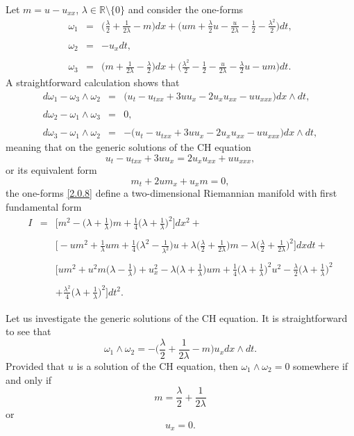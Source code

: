 \documentclass{cimart}
\newcommand{\ba}{\begin{array}}
\newcommand{\bb}{\begin{equation}}
\newcommand{\ea}{\end{array}}
\newcommand{\ee}{\end{equation}}
\begin{document}
\begin{example}\label{ex2.2}
     Let $m=u-u_{xx}$, $\lambda\in\mathbb{R}\setminus\{0\}$ and consider the one-forms
\bb\label{2.0.8}
\ba{lcl}
\omega_1&=&{\Big(\frac{\lambda}{2}+\frac{1}{2\lambda}-m\Big)dx+\Big(um+\frac{\lambda}{2}u-\frac{u}{2\lambda}-\frac{1}{2}-\frac{\lambda^2}{2}\Big)dt},\\
\\
\omega_2&=&-u_xdt,\\
\\
\omega_3&=&{\Big(m+\frac{1}{2\lambda}-\frac{\lambda}{2}\Big)dx+\Big(\frac{\lambda^2}{2}-\frac{1}{2}-\frac{u}{2\lambda}-\frac{\lambda}{2}u-um\Big)dt}.
\ea
\ee
A straightforward calculation shows that
\bb\label{2.0.9}
\ba{lcl}
d\omega_1-\omega_3\wedge\omega_2&=&\Big(u_t-u_{txx}+3uu_x-2u_xu_{xx}-uu_{xxx}\Big)dx\wedge dt,\\
\\
d\omega_2-\omega_1\wedge\omega_3&=&0,\\
\\
d\omega_3-\omega_1\wedge\omega_2&=&-\Big(u_t-u_{txx}+3uu_x-2u_xu_{xx}-uu_{xxx}\Big)dx\wedge dt,
\ea
\ee
meaning that on the generic solutions of the CH equation 
   \bb\label{1.0.5}
    u_t-u_{txx}+3uu_x=2u_xu_{xx}+uu_{xxx},
    \ee
    or its equivalent form
    \bb\label{1.0.6}
    m_t+2um_x+u_xm=0,
    \ee
the one-forms \eqref{2.0.8} define a two-dimensional Riemannian manifold with first fundamental form
$$
\ba{lcl}
I&=&{\Big[m^2-\Big(\lambda+\frac{1}{\lambda}\Big)m+\frac{1}{4}\Big(\lambda+\frac{1}{\lambda}\Big)^2\Big]dx^2}+\\
\\
&&{\Big[-um^2+\frac{1}{\lambda}um+\frac{1}{4}\Big(\lambda^2-\frac{1}{\lambda^2}\Big)u+\lambda\Big(\frac{\lambda}{2}+\frac{1}{2\lambda}\Big)m-\lambda\Big(\frac{\lambda}{2}+\frac{1}{2\lambda}\Big)^2\Big]dxdt}+\\
\\
&&{\Big[um^2+u^2m\Big(\lambda-\frac{1}{\lambda}\Big)+u_x^2-\lambda\Big(\lambda+\frac{1}{\lambda}\Big)um+\frac{1}{4}\Big(\lambda+\frac{1}{\lambda}\Big)^2u^2-\frac{\lambda}{2}\Big(\lambda+\frac{1}{\lambda}\Big)^2}\\
\\
&&{+\frac{\lambda^2}{4}\Big(\lambda+\frac{1}{\lambda}\Big)^2\Big]dt^2}.
\ea
$$

Let us investigate the generic solutions of the CH equation. It is straightforward to see that
   $$
    \omega_1\wedge\omega_2=-\Big(\frac{\lambda}{2}+\frac{1}{2\lambda}-m\Big)u_x dx\wedge dt.
   $$
    Provided that $u$ is a solution of the CH equation, then $\omega_1\wedge\omega_2=0$ somewhere if and only if 
    \bb\label{2.0.10}
    m=\frac{\lambda}{2}+\frac{1}{2\lambda}
    \ee
    or
    \bb\label{2.0.11}
    u_x=0.
    \ee
\end{example}
\end{document}
